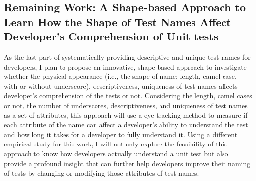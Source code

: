 \subsection{Remaining Work: A Shape-based Approach to Learn How the Shape of Test Names Affect Developer's Comprehension of Unit tests}

As the last part of systematically providing descriptive and unique test names for developers, I plan to propose an innovative, shape-based approach to investigate whether the physical appearance (i.e., the shape of name: length, camel case, with or without underscore), descriptiveness, uniqueness of test names affects developer's comprehension of the tests or not.
%
Considering the length, camel cases or not, the number of underscores, descriptiveness, and uniqueness of test names as a set of attributes, this approach will use a eye-tracking method to measure if each attribute of the name can affect a developer's ability to understand the test and how long it takes for a developer to fully understand it.
%
Using a different empirical study for this work, I will not only explore the feasibility of this approach to know how developers actually understand a unit test but also provide a profound insight that can further help developers improve their naming of tests by changing or modifying those attributes of test names.

